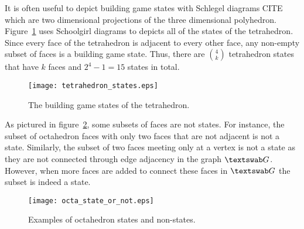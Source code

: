 It is often useful to depict building game states with Schlegel diagrams CITE which are two dimensional projections of the three dimensional polyhedron. Figure~\ref{fig:TetraStates} uses Schoolgirl diagrams to depicts all of the states of the tetrahedron. Since every face of the tetrahedron is adjacent to every other face, any non-empty subset of faces is a building game state. Thus, there are ${4 \choose k}$ tetrahedron states that have $k$ faces and $2^4 - 1 = 15$ states in total. 
\begin{figure}[ht]
  \texttt{[image: tetrahedron\_states.eps]}
\caption{The building game states of the tetrahedron.}
\label{fig:TetraStates}
\end{figure}
As pictured in figure~\ref{fig:OctaStates}, some subsets of faces are not states. For instance, the subset of octahedron faces with only two faces that are not adjacent is not a state. Similarly, the subset of two faces meeting only at a vertex is not a state as they are not connected through edge adjacency in the graph $\PolyGraph$. However, when more faces are added to connect these faces in $\PolyGraph$ the subset is indeed a state.

\begin{figure}[ht]
  \texttt{[image: octa\_state\_or\_not.eps]}
\caption{Examples of octahedron states and non-states.}
\label{fig:OctaStates}
\end{figure}
 


 



